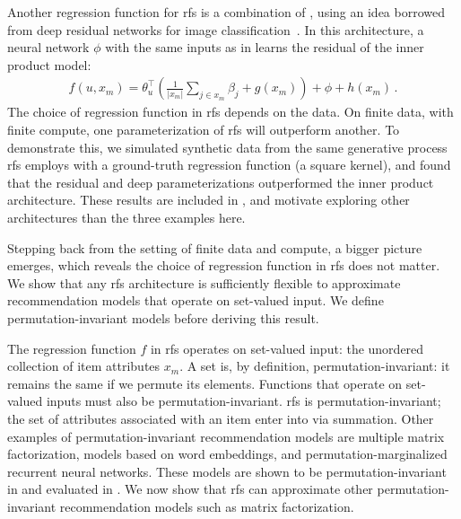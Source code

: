Another regression function for \gls{rfs} is a combination of
, using an idea borrowed from deep
residual networks for image classification~\citep{he2015deep}. In this
architecture, a neural network $\phi$ with the same inputs as in
 learns the residual of the inner product model:
\begin{align}
  f\left(u, x_m\right) = \theta_u^\top\left(\frac{1}{|x_m|}\sum_{j\in x_m}
  \beta_j + g(x_m)\right) + \phi + h(x_m) \, .
  \label{eqn:residual}
\end{align}
The choice of regression function in \acrshort{rfs} depends on the data. On finite data, with finite compute, one parameterization of \gls{rfs} will outperform another. To demonstrate this, we simulated synthetic data from the same generative process \gls{rfs} employs with a ground-truth regression function (a square kernel), and found that the residual and deep parameterizations outperformed the inner product architecture. These results are included in , and motivate exploring other architectures than the three examples here.

Stepping back from the setting of finite data and compute, a bigger picture emerges, which reveals the choice of regression function in \gls{rfs} does not matter. We show that any \gls{rfs} architecture is sufficiently flexible to approximate recommendation models that operate on set-valued input. We define permutation-invariant models before deriving this result.

The regression function $f$ in \gls{rfs} operates on set-valued input: the unordered collection of item attributes $x_m$. A set is, by definition, permutation-invariant: it remains the same if we permute its elements. Functions that operate on set-valued inputs must also be permutation-invariant. \gls{rfs} is permutation-invariant; the set of attributes associated with an item enter into  via summation. Other examples of permutation-invariant recommendation models are multiple matrix factorization, models based on word embeddings, and permutation-marginalized recurrent neural networks. These models are shown to be permutation-invariant in  and evaluated in . We now show that \gls{rfs} can approximate other permutation-invariant recommendation models such as matrix factorization.

